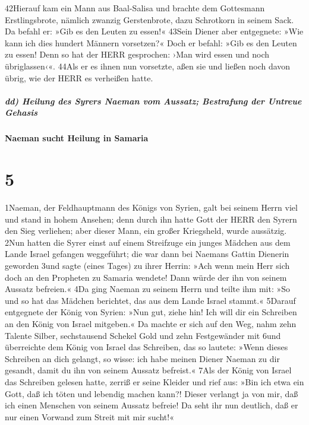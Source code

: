 42Hierauf kam ein Mann aus Baal-Salisa und brachte dem Gottesmann
Erstlingsbrote, nämlich zwanzig Gerstenbrote, dazu Schrotkorn in seinem
Sack. Da befahl er: »Gib es den Leuten zu essen!« 43Sein Diener aber
entgegnete: »Wie kann ich dies hundert Männern vorsetzen?« Doch er
befahl: »Gib es den Leuten zu essen! Denn so hat der HERR gesprochen:
›Man wird essen und noch übriglassen‹«. 44Als er es ihnen nun vorsetzte,
aßen sie und ließen noch davon übrig, wie der HERR es verheißen hatte.

\hypertarget{dd-heilung-des-syrers-naeman-vom-aussatz-bestrafung-der-untreue-gehasis}{%
\subparagraph{dd) Heilung des Syrers Naeman vom Aussatz; Bestrafung der
Untreue
Gehasis}\label{dd-heilung-des-syrers-naeman-vom-aussatz-bestrafung-der-untreue-gehasis}}

\hypertarget{naeman-sucht-heilung-in-samaria}{%
\paragraph{Naeman sucht Heilung in
Samaria}\label{naeman-sucht-heilung-in-samaria}}

\hypertarget{section-4}{%
\section{5}\label{section-4}}

1Naeman, der Feldhauptmann des Königs von Syrien, galt bei seinem Herrn
viel und stand in hohem Ansehen; denn durch ihn hatte Gott der HERR den
Syrern den Sieg verliehen; aber dieser Mann, ein großer Kriegsheld,
wurde aussätzig. 2Nun hatten die Syrer einst auf einem Streifzuge ein
junges Mädchen aus dem Lande Israel gefangen weggeführt; die war dann
bei Naemans Gattin Dienerin geworden 3und sagte (eines Tages) zu ihrer
Herrin: »Ach wenn mein Herr sich doch an den Propheten zu Samaria
wendete! Dann würde der ihn von seinem Aussatz befreien.« 4Da ging
Naeman zu seinem Herrn und teilte ihm mit: »So und so hat das Mädchen
berichtet, das aus dem Lande Israel stammt.« 5Darauf entgegnete der
König von Syrien: »Nun gut, ziehe hin! Ich will dir ein Schreiben an den
König von Israel mitgeben.« Da machte er sich auf den Weg, nahm zehn
Talente Silber, sechstausend Schekel Gold und zehn Festgewänder mit 6und
überreichte dem König von Israel das Schreiben, das so lautete: »Wenn
dieses Schreiben an dich gelangt, so wisse: ich habe meinen Diener
Naeman zu dir gesandt, damit du ihn von seinem Aussatz befreist.« 7Als
der König von Israel das Schreiben gelesen hatte, zerriß er seine
Kleider und rief aus: »Bin ich etwa ein Gott, daß ich töten und lebendig
machen kann?! Dieser verlangt ja von mir, daß ich einen Menschen von
seinem Aussatz befreie! Da seht ihr nun deutlich, daß er nur einen
Vorwand zum Streit mit mir sucht!«

